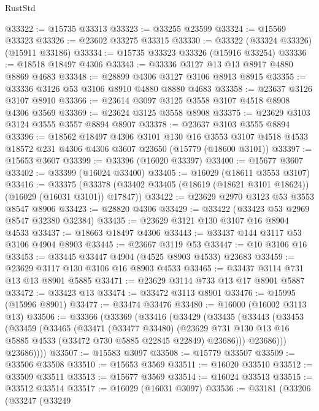 \begin{lexlean}{RustStd}
\begin{coremodule}
@33322 := @15735 @33313
@33323 := @33255 @23599
@33324 := @15569 @33323
@33326 := @23602 @33275 @33315
@33330 := @33322 (@33324 @33326) (@15911 @33186)
@33334 := @15735 @33323 @33326 (@15916 @33254)
@33336 := @18518 @18497 @4306
@33343 := @33336 @3127 @13 @13 @8917 @4880 @8869 @4683
@33348 := @28899 @4306 @3127 @3106 @8913 @8915
@33355 := @33336 @3126 @53 @3106 @8910 @4880 @8880 @4683
@33358 := @23637 @3126 @3107 @8910
@33366 := @23614 @3097 @3125 @3558 @3107 @4518 @8908 @4306 @3569
@33369 := @23624 @3125 @3558 @8908
@33375 := @23629 @3103 @3124 @3555 @3557 @8894 @8907
@33378 := @23637 @3103 @3555 @8894
@33396 := @18562
    @18497
    @4306
    @3101
    @130
    @16
    @3553
    @3107
    @4518
    @4533
    @18572
    @231
    @4306
    @4306
    @3607
    @23650
    (@15779 (@18600 @3101))
@33397 := @15653 @3607
@33399 := @33396 (@16020 @33397)
@33400 := @15677 @3607
@33402 := @33399 (@16024 @33400)
@33405 := @16029 (@18611 @3553 @3107)
@33416 := @33375
    (@33378 (@33402 @33405 (@18619 (@18621 @3101 @18624)) (@16029 (@16031 @3101)) @17847))
@33422 := @23629 @2970 @3123 @53 @3553 @8547 @8906
@33423 := @28820 @4306
@33429 := @33422 (@33423 @53 @2969 @8547 @32380 @32384)
@33435 := @23629 @3121 @130 @3107 @16 @8904 @4533
@33437 := @18663 @18497 @4306
@33443 := @33437 @144 @3117 @53 @3106 @4904 @8903
@33445 := @23667 @3119 @53
@33447 := @10 @3106 @16
@33453 := @33445 @33447 @4904 (@4525 @8903 @4533) @23683
@33459 := @23629 @3117 @130 @3106 @16 @8903 @4533
@33465 := @33437 @3114 @731 @13 @13 @8901 @5885
@33471 := @23629 @3114 @733 @13 @17 @8901 @5887
@33472 := @33423 @13
@33474 := @33472 @3113 @8901
@33476 := @15995 (@15996 @8901)
@33477 := @33474 @33476
@33480 := @16000 (@16002 @3113 @13)
@33506 := @33366
    (@33369
      (@33416
        (@33429
          (@33435
            (@33443
              (@33453
                (@33459
                  (@33465
                    (@33471
                      (@33477 @33480)
                      (@23629
                        @731
                        @130
                        @13
                        @16
                        @5885
                        @4533
                        (@33472 @730 @5885 @22845 @22849)
                        @23686)))
                  @23686)))
            @23686))))
@33507 := @15583 @3097
@33508 := @15779 @33507
@33509 := @33506 @33508
@33510 := @15653 @3569
@33511 := @16020 @33510
@33512 := @33509 @33511
@33513 := @15677 @3569
@33514 := @16024 @33513
@33515 := @33512 @33514
@33517 := @16029 (@16031 @3097)
@33536 := @33181
    (@33206
      (@33247
        (@33249

\end{coremodule}
\end{lexlean}
